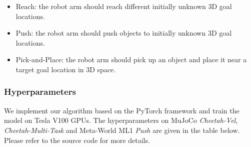 \documentclass[letterpaper]{article} %
\begin{document}
\begin{itemize}
\item Reach: the robot arm should reach different initially unknown 3D goal locations.
\item Push: the robot arm should push objects to initially unknown 3D goal locations.
\item Pick-and-Place: the robot arm should pick up an object and place it near a target goal location in 3D space.
\end{itemize}



\subsubsection{Hyperparameters}
\label{sec:hyperparameters}
We implement our algorithm based on the PyTorch framework \cite{pytorch} and train the model on Tesla V100 GPUs. The hyperparameters on MuJoCo \emph{Cheetah-Vel}, \emph{Cheetah-Multi-Task} and Meta-World ML1 \emph{Push} are given in the table below. Please refer to the source code for more details.
\end{document}
